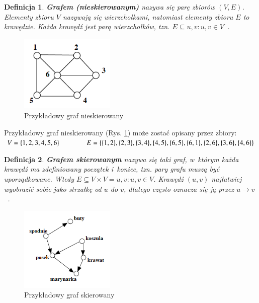 \documentclass[twoside,12pt]{report}
\newtheorem{definition}{Definicja} %
\begin{document}
\begin{definition}\label{def:graf_nieskierowany}
\textbf{Grafem (nieskierowanym)} nazywa się parę zbiorów $(V,E)$. Elementy zbioru $V$ nazywają się \textit{wierzchołkami}, natomiast elementy zbioru $E$ to \textit{krawędzie}. Każda krawędź jest parą wierzchołków, tzn. $E \subseteq {{u,v}:u,v \in V}$~\cite{grafy}.
\end{definition}

\begin{figure}[ht]
	\centering
	\includegraphics[width=0.40\textwidth]{img/graf1}
	\caption{Przykładowy graf nieskierowany} 
	\label{fig:graf_nieskierowany}
\end{figure}

Przykładowy graf nieskierowany (Rys. \ref{fig:graf_nieskierowany}) może zostać opisany przez zbiory:
\begin{math}
V=\{1,2,3,4,5,6\} \hspace*{40px} E=\{\{1,2\},\{2,3\},\{3,4\},\{4,5\},\{6,5\},\{6,1\},\{2,6\},\{3,6\},\{4,6\}\}
\end{math}

\begin{definition}\label{def:graf_skierowany}
\textbf{Grafem skierowanym} nazywa się taki graf, w~którym każda krawędź ma zdefiniowany początek i~koniec, tzn. pary grafu muszą być uporządkowane. Wtedy $E \subseteq V \times V = {{u,v}:u,v \in V}$.
Krawędź $(u,v)$ najłatwiej wyobrazić sobie jako strzałkę od $u$ do $v$, dlatego często oznacza się ją przez $u \rightarrow v$~\cite{grafy}.
\end{definition}

\begin{figure}[ht]
\centering
\includegraphics[width=0.40\textwidth]{img/graf2}
\caption{Przykładowy graf skierowany} 
\label{fig:graf_skierowany} 
\end{figure}
\end{document}
